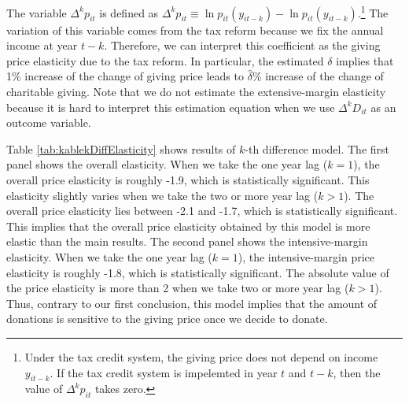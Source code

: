 \documentclass[ review  , 3p ]{elsarticle}
\begin{document}
  The variable \(\Delta^k p_{it}\) is defined as \(\Delta^k p_{it} \equiv \ln p_{it}(y_{it-k}) - \ln p_{it}(y_{it-k})\).\footnote{Under the tax credit system, the giving price does not depend on income \(y_{it-k}\). If the tax credit system is impelemted in year \(t\) and \(t-k\), then the value of \(\Delta^k p_{it}\) takes zero.}
  The variation of this variable comes from the tax reform because we fix the annual income at year \(t - k\).
  Therefore, we can interpret this coefficient as the giving price elasticity due to the tax reform.
  In particular, the estimated \(\delta\) implies that 1\% increase of the change of giving price leads to \(\hat{\delta}\)\% increase of the change of charitable giving.
  Note that we do not estimate the extensive-margin elasticity because it is hard to interpret this estimation equation when we use \(\Delta^k D_{it}\) as an outcome variable.

  Table \ref{tab:kablekDiffElasticity} shows results of \(k\)-th difference model.
  The first panel shows the overall elasticity.
  When we take the one year lag (\(k = 1\)), the overall price elasticity is roughly -1.9,
  which is statistically significant.
  This elasticity slightly varies when we take the two or more year lag (\(k > 1\)).
  The overall price elasticity lies between -2.1 and -1.7, which is statistically significant.
  This implies that the overall price elasticity obtained by this model is more elastic than the main results.
  The second panel shows the intensive-margin elasticity.
  When we take the one year lag (\(k = 1\)), the intensive-margin price elasticity is roughly -1.8,
  which is statistically significant.
  The absolute value of the price elasticity is more than 2
  when we take two or more year lag (\(k > 1\)).
  Thus, contrary to our first conclusion,
  this model implies that the amount of donations is sensitive to the giving price once we decide to donate.
\end{document}
